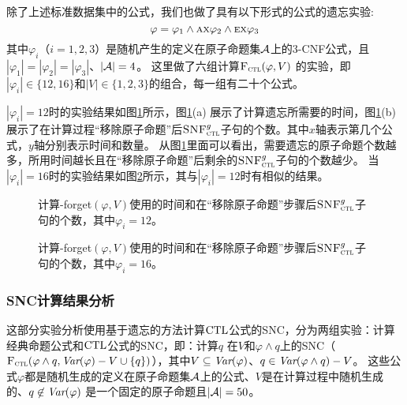 除了上述标准数据集中的公式，我们也做了具有以下形式的公式的遗忘实验:
$$\varphi=\varphi_1 \wedge \textsc{a}\textsc{x} \varphi_2 \wedge \textsc{e}\textsc{x} \varphi_3$$
其中$\varphi_i$（$i=1,2,3$）是随机产生的定义在原子命题集${\cal A}$上的3-CNF公式，且$|\varphi_1| = |\varphi_2| =|\varphi_3|$、$|{\cal A}|=4$。
这里做了六组计算${\textsc{F}_{\textsc{ctl}}}(\varphi,V)$ 的实验，即$|\varphi_i| \in \{12,16\}$和$|V|\in \{1,2,3\}$的组合，每一组有二十个公式。

$|\varphi_i|=12$时的实验结果如图\ref{chapter04:fig:for12}所示，图\ref{chapter04:fig:for12}(a) 展示了计算遗忘所需要的时间，图\ref{chapter04:fig:for12}(b)展示了在计算过程“移除原子命题”后${\textsc{SNF}_{\textsc{ctl}}^g}$子句的个数。其中$x$轴表示第几个公式，$y$轴分别表示时间和数量。
从图\ref{chapter04:fig:for12}里面可以看出，需要遗忘的原子命题个数越多，所用时间越长且在“移除原子命题”后剩余的${\textsc{SNF}_{\textsc{ctl}}^g}$子句的个数越少。
当$|\varphi_i|=16$时的实验结果如图\ref{chapter04:fig:for16}所示，其与$|\varphi_i|=12$时有相似的结果。

\begin{figure*}[!htb]
	\centering
	\caption{计算{\CTL-forget}$(\varphi, V)$使用的时间和在“移除原子命题”步骤后${\textsc{SNF}_{\textsc{ctl}}^g}$子句的个数，其中$\varphi_i=12$。}
	\label{chapter04:fig:for12}
\end{figure*}

\begin{figure*}[!htb]
	\centering
	\caption{计算{\CTL-forget}$(\varphi, V)$使用的时间和在“移除原子命题”步骤后${\textsc{SNF}_{\textsc{ctl}}^g}$子句的个数，其中$\varphi_i=16$。}
	\label{chapter04:fig:for16}
\end{figure*}

\subsubsection{SNC计算结果分析}
这部分实验分析使用基于遗忘的方法计算$\textrm{CTL}$公式的SNC，分为两组实验：计算经典命题公式和$\textrm{CTL}$公式的SNC，即：计算$q$ 在$V$和$\varphi \wedge q$上的SNC（${\textsc{F}_{\textsc{ctl}}}(\varphi\wedge q, \textit{Var}(\varphi)-V \cup \{q\})$），其中$V\subseteq \textit{Var}(\varphi)$、$q\in \textit{Var}(\varphi\wedge q)-V$。
这些公式$\varphi$都是随机生成的定义在原子命题集${\cal A}$上的公式、$V$是在计算过程中随机生成的、$q\not \in \textit{Var}(\varphi)$ 是一个固定的原子命题且$|{\cal A}|=50$。

